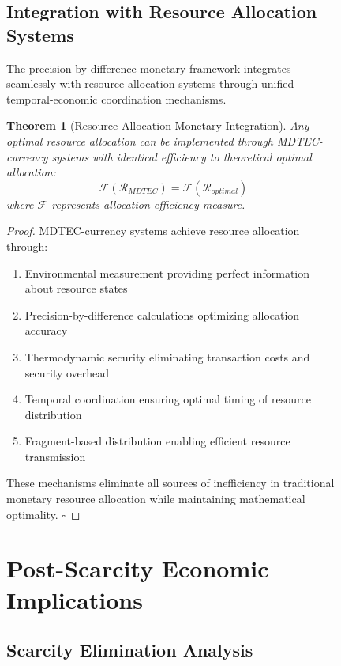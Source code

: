 \documentclass[12pt,a4paper]{article}
\newtheorem{theorem}{Theorem}
\begin{document}
\begin{figure}[H]
\subsection{Integration with Resource Allocation Systems}

The precision-by-difference monetary framework integrates seamlessly with resource allocation systems through unified temporal-economic coordination mechanisms.

\begin{theorem}[Resource Allocation Monetary Integration]
Any optimal resource allocation can be implemented through MDTEC-currency systems with identical efficiency to theoretical optimal allocation:
\begin{equation}
\mathcal{F}(\mathcal{R}_{MDTEC}) = \mathcal{F}(\mathcal{R}_{optimal})
\end{equation}
where $\mathcal{F}$ represents allocation efficiency measure.
\end{theorem}

\begin{proof}
MDTEC-currency systems achieve resource allocation through:
\begin{enumerate}
\item Environmental measurement providing perfect information about resource states
\item Precision-by-difference calculations optimizing allocation accuracy
\item Thermodynamic security eliminating transaction costs and security overhead
\item Temporal coordination ensuring optimal timing of resource distribution
\item Fragment-based distribution enabling efficient resource transmission
\end{enumerate}

These mechanisms eliminate all sources of inefficiency in traditional monetary resource allocation while maintaining mathematical optimality. $\square$
\end{proof}

\section{Post-Scarcity Economic Implications}

\subsection{Scarcity Elimination Analysis}


\end{figure}
\end{document}
